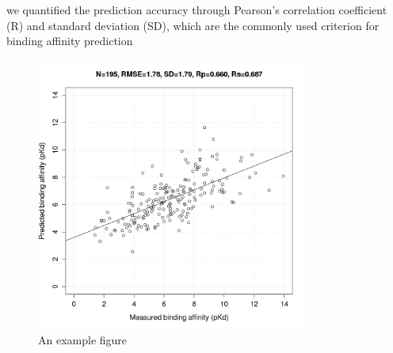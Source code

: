 \documentclass[journal=jacsat,manuscript=article]{achemso}
\begin{document}
we quantified the prediction accuracy through Pearson's correlation coefficient (R) and standard deviation (SD), which are the commonly used criterion for binding affinity prediction

\begin{figure}
  \begin{center}
  \includegraphics[width=0.8\textwidth,natwidth=960,natheight=960]{../rfcyscore/x4/mlr/trn-247-tst-195-yr.png}
  \end{center}
  \caption{An example figure}
  \label{fgr:example}
\end{figure}
\end{document}
